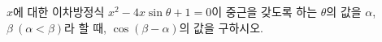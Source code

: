 $x$에 대한 이차방정식 $x^2-4x\sin\theta+1=0$이 중근을 갖도록 하는 $\theta$의 값을 $\alpha$, $\beta\ (\alpha<\beta)$라 할 때, $\cos(\beta-\alpha)$의 값을 구하시오. 

